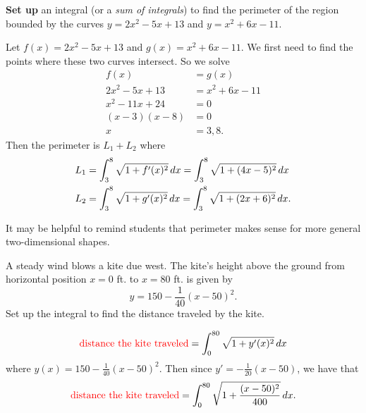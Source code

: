 \documentclass[noinstructornotes]{ximera}
\begin{document}
\begin{problem}
{\bf Set up} an integral (or a {\it sum of integrals}) to find the perimeter of the region bounded by the curves $y=2x^2-5x+13$ and $y=x^2+6x-11$.
	\begin{freeResponse}
	Let $f(x) = 2x^2-5x+13$ and $g(x) = x^2+6x-11$.
	We first need to find the points where these two curves intersect.  
	So we solve
		\begin{align*}
		f(x) &= g(x)  \\
		2x^2-5x+13 &= x^2+6x-11  \\
		x^2-11x+24 &= 0  \\
		(x-3)(x-8) &= 0  \\
		x &= 3,8.
		\end{align*}
	Then the perimeter is $L_1 + L_2$ where
		\begin{align*}
		L_1 &= \int_3^8 \sqrt{1+f'(x)^2} \,d x = \int_3^8 \sqrt{1+(4x-5)^2} \,d x  \\
		L_2 &= \int_3^8 \sqrt{1+g'(x)^2} \,d x = \int_3^8 \sqrt{1+(2x+6)^2} \,d x.
		\end{align*}	
	\end{freeResponse}
	
\end{problem}

\begin{instructorNotes}
It may be helpful to remind students that perimeter makes sense for more general two-dimensional shapes.
\end{instructorNotes}














\begin{problem}
A steady wind blows a kite due west.  
The kite's height above the ground from horizontal position $x=0$ ft. to $x=80$ ft. is given by
	\[
	y = 150 - \frac{1}{40}(x-50)^2.
	\]
Set up the integral to find the distance traveled by the kite.  
	\begin{freeResponse}
		\[
		\text{{\color{red} distance the kite traveled}} = \int_0^{80} \sqrt{1+y'(x)^2} \,d x
		\]
	where $y(x) = 150 - \frac{1}{40}(x-50)^2$.  
	Then since $y' = - \frac{1}{20}(x-50)$, we have that
		\[
		\text{{\color{red} distance the kite traveled}} = \int_0^{80} \sqrt{1 + \frac{(x-50)^2}{400}} \,d x.
		\]
	\end{freeResponse}
		
\end{problem}
\end{document}
